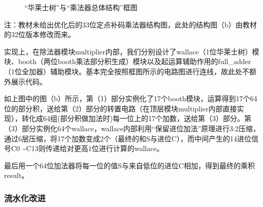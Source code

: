 \documentclass[11pt]{article}
\begin{document}
\begin{figure}[H]
  \centering
  \caption{“华莱士树”与“乘法器总体结构”框图}
\end{figure}

注：教材未给出优化后的33位定点补码乘法器结构图，此处的结构图（b）由教材的32位版本修改而来。

实现上，在除法器模块multiplier内部，我们分别设计了wallace（1位华莱士树）模块、booth（两位booth乘法部分积生成）模块以及起运算辅助作用的full_adder（1位全加器）辅助模块。基本完全按照框图所示的电路图进行连线，故此处不额外展示代码。

如上图中的图（b）所示，第（1）部分实例化了17个booth模块，运算得到17个64位的部分积，送给第（2）部分的转置电路（在顶层模块multiplier内部直接实现），转化成64组(部分积做加法时)每一位上的17个加数，送给第（3）部分。第（3）部分实例化64个wallace，wallace内部利用“保留进位加法”原理进行3:2压缩，通过6层压缩，将17个加数变成2个（最终的和S与进位C），而中间产生的14进位信号C0 \textasciitilde C13则传递给对更高1位进行计算的wallace。

最后用一个64位加法器将每一位的值S与来自低位的进位C相加，得到最终的乘积result。

\subsubsection{流水化改进}
\end{document}
